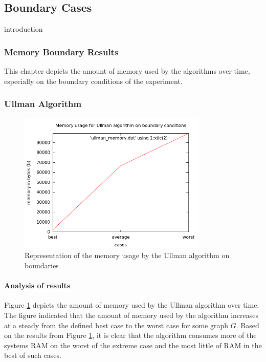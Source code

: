 \subsection{Boundary Cases}
\label{Boundary Cases}

{introduction}

\subsubsection{Memory Boundary Results}
\label{Memory Boundary Results}
This chapter depicts the amount of memory used by the algorithms over time, especially on the boundary conditions of the experiment.

\subsubsection{Ullman Algorithm}
\begin{figure}[H]
  \begin{center}
      \includegraphics[width=0.8\textwidth]{ullman_memory.png}
  \end{center}    
  \caption{Representation of the memory usage by the Ullman algorithm on boundaries}
  \label{fig:case_ullman_memory}
\end{figure} 

\paragraph{Analysis of results}
Figure \ref{fig:case_ullman_memory} depicts the amount of memory used by the Ullman algorithm over time. The figure indicated that the amount of memory used
by the algorithm increases at a steady from the defined best case to the worst case for some graph $G$.\newline\newline
Based on the results from Figure \ref{fig:case_ullman_memory}, it is clear that the algorithm consumes more of the systems RAM on the worst of the extreme case
and the most little of RAM in the best of such cases.

